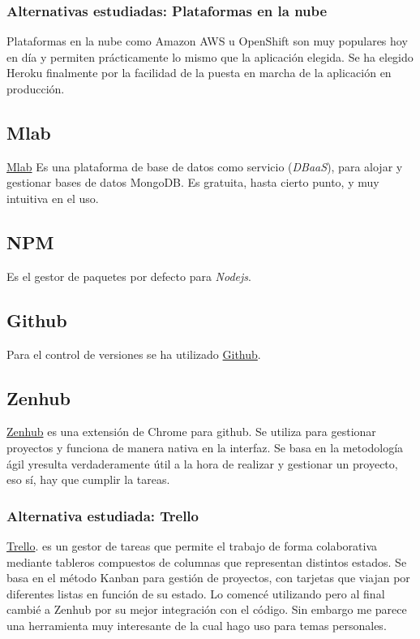  \subsubsection{Alternativas estudiadas: Plataformas en la nube}\label{tnube}
  Plataformas en la nube como Amazon AWS u OpenShift son muy populares hoy en día y permiten prácticamente lo mismo que la aplicación elegida. Se ha elegido Heroku finalmente por la facilidad de la puesta en marcha de la aplicación en producción.
  
 \subsection{Mlab}\label{mlab}
 \hyperlink{https://mlab.com/}{Mlab} Es una plataforma de base de datos como servicio (\emph{DBaaS}), para alojar y gestionar bases de datos MongoDB. Es gratuita, hasta cierto punto, y muy intuitiva en el uso.


 
  
   \subsection{NPM}\label{npm}
Es el gestor de paquetes por defecto para \emph{Nodejs}.
  
   \subsection{Github}\label{github}
   Para el control de versiones se ha utilizado \hyperlink{https://www.github.com/}{Github}. 
   
    \subsection{Zenhub}\label{zenhub}
    \hyperlink{https://www.zenhub.io/}{Zenhub} es una extensión de Chrome para github. Se utiliza para gestionar proyectos y funciona de manera nativa en la interfaz. Se basa en la metodología ágil yresulta verdaderamente útil a la hora de realizar y gestionar un proyecto, eso sí, hay que cumplir la tareas. 
    
     \subsubsection{Alternativa estudiada: Trello}\label{trello}
      \hyperlink{https://www.trello.com/}{Trello}.  es un gestor de tareas que permite el trabajo de forma colaborativa mediante tableros compuestos de columnas  que representan distintos estados. Se basa en el método Kanban para gestión de proyectos, con tarjetas que viajan por diferentes listas en función de su estado. Lo comencé utilizando pero al final cambié a Zenhub por su mejor integración con el código. Sin embargo me parece una herramienta muy interesante de la cual hago uso para temas personales. 
     
     




